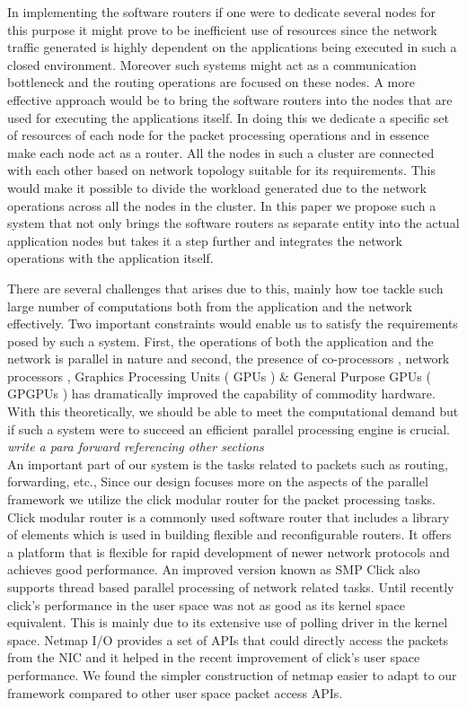 \documentclass[conference]{IEEEtran}
\begin{document}
In implementing the software routers if one were to dedicate several nodes for this purpose it might prove to be inefficient use of resources since the network traffic generated is highly dependent on the applications being executed in such a closed environment. Moreover such systems might act as a communication bottleneck and the routing operations are focused on these nodes. A more effective approach would be to bring the software routers into the nodes that are used for executing the applications itself. In doing this we dedicate a specific set of resources of each node for the packet processing operations and in essence make each node act as a router. All the nodes in such a cluster are connected with each other based on network topology suitable for its requirements. This would make it possible to divide the workload generated due to the network operations across all the nodes in the cluster. In this paper we propose such a system that not only brings the software routers as separate entity into the actual application nodes but takes it a step further and integrates the network operations with the application itself. 

There are several challenges that arises due to this, mainly how toe tackle such large number of computations both from the application and the network effectively. Two important constraints would enable us to satisfy the requirements posed by such a system. First, the operations of both the application and the network is parallel in nature and second, the presence of co-processors \cite{coproc}, network processors \cite{NP}, Graphics Processing Units ( GPUs ) \& General Purpose GPUs ( GPGPUs ) \cite{gpu} has dramatically improved the capability of commodity hardware. With this theoretically, we should be able to meet the computational demand but if such a system were to succeed an efficient parallel processing engine is crucial.\\

\textit{write a para forward referencing other sections}\\

An important part of our system is the tasks related to packets such as routing, forwarding, etc., Since our design focuses more on the aspects of the parallel framework we utilize the click modular router for the packet processing tasks. Click modular router \cite{click} is a commonly used software router that includes a library of elements which is used in building flexible and reconfigurable routers. It offers a platform that is flexible for rapid development of newer network protocols and achieves good performance. An improved version known as SMP Click \cite{smpclick} also supports thread based parallel processing of network related tasks. Until recently click's performance in the user space was not as good as its kernel space equivalent. This is mainly due to its extensive use of polling driver in the kernel space. Netmap I/O \cite{netmap} provides a set of APIs that could directly access the packets from the NIC and it helped in the recent improvement of click's user space performance. We found the simpler construction of netmap easier to adapt to our framework  compared to other user space packet access APIs.   
\end{document}
